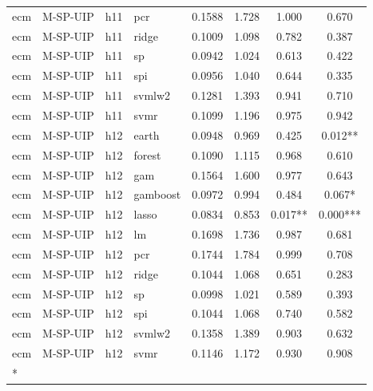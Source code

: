 \begin{ThreePartTable}
\begin{longtable}[t]{llclcccc}
ecm & M-SP-UIP & h11 & pcr & 0.1588 & 1.728 & 1.000 & 0.670\\
ecm & M-SP-UIP & h11 & ridge & 0.1009 & 1.098 & 0.782 & 0.387\\
ecm & M-SP-UIP & h11 & sp & 0.0942 & 1.024 & 0.613 & 0.422\\
ecm & M-SP-UIP & h11 & spi & 0.0956 & 1.040 & 0.644 & 0.335\\
ecm & M-SP-UIP & h11 & svmlw2 & 0.1281 & 1.393 & 0.941 & 0.710\\
ecm & M-SP-UIP & h11 & svmr & 0.1099 & 1.196 & 0.975 & 0.942\\
\addlinespace
ecm & M-SP-UIP & h12 & earth & 0.0948 & 0.969 & 0.425 & 0.012**\\
ecm & M-SP-UIP & h12 & forest & 0.1090 & 1.115 & 0.968 & 0.610\\
ecm & M-SP-UIP & h12 & gam & 0.1564 & 1.600 & 0.977 & 0.643\\
ecm & M-SP-UIP & h12 & gamboost & 0.0972 & 0.994 & 0.484 & 0.067*\\
ecm & M-SP-UIP & h12 & lasso & 0.0834 & 0.853 & 0.017** & 0.000***\\
ecm & M-SP-UIP & h12 & lm & 0.1698 & 1.736 & 0.987 & 0.681\\
ecm & M-SP-UIP & h12 & pcr & 0.1744 & 1.784 & 0.999 & 0.708\\
ecm & M-SP-UIP & h12 & ridge & 0.1044 & 1.068 & 0.651 & 0.283\\
ecm & M-SP-UIP & h12 & sp & 0.0998 & 1.021 & 0.589 & 0.393\\
ecm & M-SP-UIP & h12 & spi & 0.1044 & 1.068 & 0.740 & 0.582\\
ecm & M-SP-UIP & h12 & svmlw2 & 0.1358 & 1.389 & 0.903 & 0.632\\
ecm & M-SP-UIP & h12 & svmr & 0.1146 & 1.172 & 0.930 & 0.908\\*
\end{longtable}
\end{ThreePartTable}
\endgroup{}
